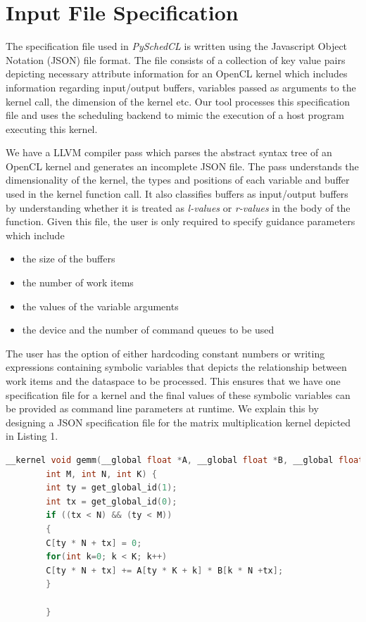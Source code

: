     \section{Input File Specification}
	The specification file used in {\em PySchedCL} is written using the Javascript Object Notation (JSON) file format. The file consists of a collection of key value pairs depicting  necessary attribute information for an OpenCL kernel which includes information regarding input/output buffers, variables passed as arguments to the kernel call, the dimension of the kernel etc. Our tool processes this specification file and uses the scheduling backend to mimic the execution of a host program executing this kernel. 
	\par We have a LLVM compiler pass which parses the abstract syntax tree of an OpenCL kernel and generates an incomplete JSON file. The pass understands the dimensionality of the kernel, the types and positions of each variable and buffer used in the kernel function call. It also classifies buffers as input/output buffers by understanding whether it is treated as \textit{l-values} or \textit{r-values} in the body of the function. Given this file, the user is only required to specify guidance parameters which include 
	\begin{itemize}
		\item the size of the buffers
		\item the number of work items
		\item the values of the variable arguments
		\item the device and the number of command queues to be used
	\end{itemize}
	
	 The user has the option of either hardcoding constant numbers or writing expressions containing symbolic variables that depicts the relationship between work items and the dataspace to be processed. This ensures that we have one specification file for a kernel and the final values of these symbolic variables can be provided as command line parameters at runtime. We explain this by designing a JSON specification file for the matrix multiplication kernel depicted in Listing 1.

    \begin{lstlisting}[caption={OpenCL Kernel for Matrix Multiplication},captionpos=b,frame=single,basicstyle=\tiny,language=C]
        __kernel void gemm(__global float *A, __global float *B, __global float *C, 
        int M, int N, int K) {
        int ty = get_global_id(1);
        int tx = get_global_id(0);
        if ((tx < N) && (ty < M))
        {
        C[ty * N + tx] = 0;
        for(int k=0; k < K; k++)
        C[ty * N + tx] += A[ty * K + k] * B[k * N +tx];
        }
        
        }
    \end{lstlisting}

